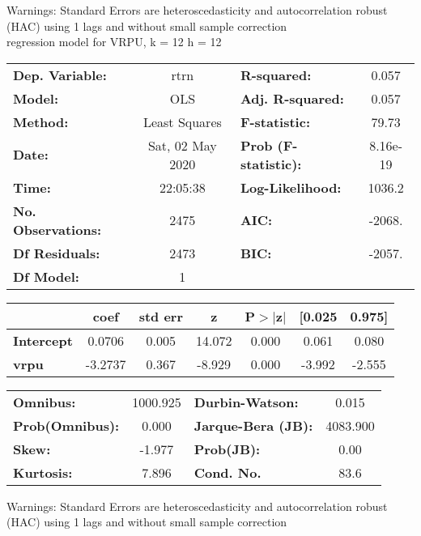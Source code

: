 Warnings: \newline
 [1] Standard Errors are heteroscedasticity and autocorrelation robust (HAC) using 1 lags and without small sample correction\\ 

regression model for VRPU, k = 12 h = 12\begin{center}
\begin{tabular}{lclc}
\toprule
\textbf{Dep. Variable:}    &       rtrn       & \textbf{  R-squared:         } &     0.057   \\
\textbf{Model:}            &       OLS        & \textbf{  Adj. R-squared:    } &     0.057   \\
\textbf{Method:}           &  Least Squares   & \textbf{  F-statistic:       } &     79.73   \\
\textbf{Date:}             & Sat, 02 May 2020 & \textbf{  Prob (F-statistic):} &  8.16e-19   \\
\textbf{Time:}             &     22:05:38     & \textbf{  Log-Likelihood:    } &    1036.2   \\
\textbf{No. Observations:} &        2475      & \textbf{  AIC:               } &    -2068.   \\
\textbf{Df Residuals:}     &        2473      & \textbf{  BIC:               } &    -2057.   \\
\textbf{Df Model:}         &           1      & \textbf{                     } &             \\
\bottomrule
\end{tabular}
\begin{tabular}{lcccccc}
                   & \textbf{coef} & \textbf{std err} & \textbf{z} & \textbf{P$> |$z$|$} & \textbf{[0.025} & \textbf{0.975]}  \\
\midrule
\textbf{Intercept} &       0.0706  &        0.005     &    14.072  &         0.000        &        0.061    &        0.080     \\
\textbf{vrpu}      &      -3.2737  &        0.367     &    -8.929  &         0.000        &       -3.992    &       -2.555     \\
\bottomrule
\end{tabular}
\begin{tabular}{lclc}
\textbf{Omnibus:}       & 1000.925 & \textbf{  Durbin-Watson:     } &    0.015  \\
\textbf{Prob(Omnibus):} &   0.000  & \textbf{  Jarque-Bera (JB):  } & 4083.900  \\
\textbf{Skew:}          &  -1.977  & \textbf{  Prob(JB):          } &     0.00  \\
\textbf{Kurtosis:}      &   7.896  & \textbf{  Cond. No.          } &     83.6  \\
\bottomrule
\end{tabular}
\end{center}

Warnings: \newline
 [1] Standard Errors are heteroscedasticity and autocorrelation robust (HAC) using 1 lags and without small sample correction\\ 

